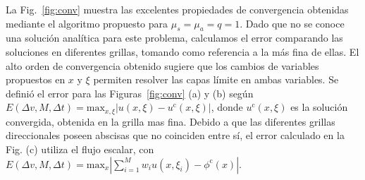 La Fig.~\eqref{fig:conv} muestra las excelentes propiedades de convergencia 
obtenidas mediante el algoritmo propuesto para $\mu_s=\mu_a=q=1$. Dado 
que no se conoce una solución analítica para este problema, calculamos 
el error comparando las soluciones en diferentes grillas, tomando 
como referencia a la más fina de ellas. El alto orden 
de convergencia obtenido sugiere que los cambios de variables 
propuestos en $x$ y $\xi$ permiten 
resolver las capas límite en ambas variables. 
Se definió el error para las Figuras~\eqref{fig:conv} (a) y (b) según
  $E(\Delta v, M,\Delta t)=\text{max}_{x,\xi}
    |u(x,\xi)-u^{\text{c}}(x,\xi)|$, donde $u^{\text{c}}(x,\xi)$ 
    es la solución convergida, obtenida en la grilla mas fina. 
Debido a que las diferentes 
    grillas direccionales poseen abscisas que no coinciden 
    entre sí,  
    el error calculado en la Fig. (c) utiliza el flujo escalar, con  
$E(\Delta v, M,\Delta t)=\text{max}_x |\sum_{i=1}^M w_i u(x,\xi_i)-\phi^{\text{c}}(x)|$.

